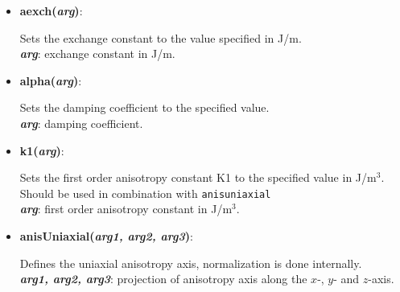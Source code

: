 \begin{itemize}
 \item {\vspace{-0.4cm}\textbf{aexch(\textit{arg})}:
				\flushright\parbox{0.9 \textwidth}{\vspace{-0.25cm} 
				Sets the exchange constant to the value specified in J/m.\\
				\textbf{\textit{arg}}: exchange constant in J/m.
				}\flushleft}

 \item {\vspace{-0.4cm}\textbf{alpha(\textit{arg})}:
				\flushright\parbox{0.9 \textwidth}{\vspace{-0.25cm} 
				Sets the damping coefficient to the specified value.\\
				\textbf{\textit{arg}}: damping coefficient.
				}\flushleft}

 \item {\vspace{-0.4cm}\textbf{k1(\textit{arg})}:
				\flushright\parbox{0.9 \textwidth}{\vspace{-0.25cm} 
				Sets the first order anisotropy constant K1 to the specified value in J/m$^3$.  Should be used in combination with \texttt{anisuniaxial}\\
				\textbf{\textit{arg}}: first order anisotropy constant in J/m$^3$.
				}\flushleft}


 \item {\vspace{-0.4cm}\textbf{anisUniaxial(\textit{arg1, arg2, arg3})}:
				\flushright\parbox{0.9 \textwidth}{\vspace{-0.25cm} 
				Defines the uniaxial anisotropy axis, normalization is done internally.\\
				\textbf{\textit{arg1, arg2, arg3}}: projection of anisotropy axis along the $x$-, $y$- and $z$-axis.
				}\flushleft}


\end{itemize}
